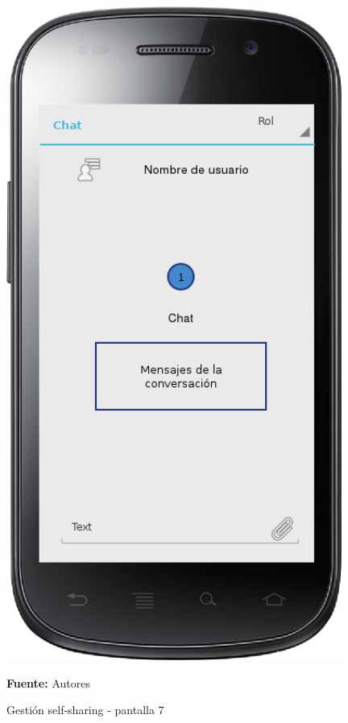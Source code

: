 \begin{figure}[!htb]
  \begin{center}
    \includegraphics[width=11cm]{./imagenes/UI/Self_sharing/self_sharing_7.png}
    \caption{Gestión self-sharing - pantalla 7}
    \label{fig:self_sharing_7}
    \textbf{Fuente:}  Autores
  \end{center}
\end{figure}

